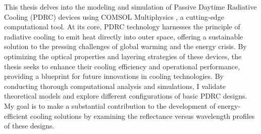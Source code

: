 
This thesis delves into the modeling and simulation of Passive Daytime Radiative Cooling (PDRC) devices using COMSOL Multiphysics \texttrademark, a cutting-edge computational tool. At its core, PDRC technology harnesses the principle of radiative cooling to emit heat directly into outer space, offering a sustainable solution to the pressing challenges of global warming and the energy crisis. By optimizing the optical properties and layering strategies of these devices, the thesis seeks to enhance their cooling efficiency and operational performance, providing a blueprint for future innovations in cooling technologies. By conducting thorough computational analysis and simulations, I validate theoretical models and explore different configurations of basic PDRC designs. My goal is to make a substantial contribution to the development of energy-efficient cooling solutions by examining the reflectance versus wavelength profiles of these designs.